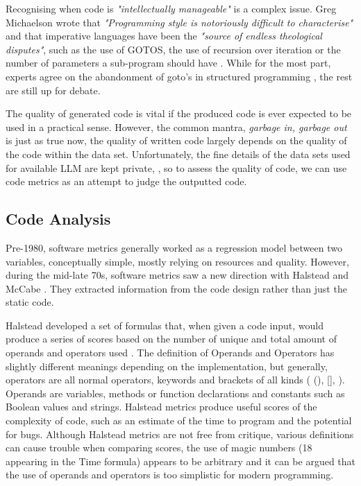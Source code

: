 \documentclass[manuscript,screen,review,sigconf]{acmart}
\begin{document}
Recognising when code is \textit{"intellectually manageable"} is a complex issue. Greg Michaelson wrote that \textit{"Programming style is notoriously difficult to characterise"} and that imperative languages have been the \textit{"source of endless theological disputes"}, such as the use of GOTOS, the use of recursion over iteration or the number of parameters a sub-program should have \cite{Automatic_analysis}. While for the most part, experts agree on the abandonment of goto's in structured programming \cite{gotoConsideredHarmful, KnuthGoTo}, the rest are still up for debate.

The quality of generated code is vital if the produced code is ever expected to be used in a practical sense. However, the common mantra, \textit{garbage in, garbage out} is just as true now, the quality of written code largely depends on the quality of the code within the data set. Unfortunately,  the fine details of the data sets used for available LLM are kept private, \cite{SysEvaOfLLMofCode}, so to assess the quality of code, we can use code metrics as an attempt to judge the outputted code.


\subsection{Code Analysis}
Pre-1980, software metrics generally worked as a regression model between two variables, conceptually simple, mostly relying on resources and quality. However, during the mid-late 70s, software metrics saw a new direction with Halstead and McCabe \cite{FENTON1999149}. They extracted information from the code design rather than just the static code.

Halstead developed a set of formulas that, when given a code input, would produce a series of scores based on the number of unique and total amount of operands and operators used \cite{Halstead}. The definition of Operands and Operators has slightly different meanings depending on the implementation, but generally, operators are all normal operators, keywords and brackets of all kinds ( (), [], {} ). Operands are variables, methods or function declarations and constants such as Boolean values and strings. Halstead metrics produce useful scores of the complexity of code, such as an estimate of the time to program and the potential for bugs. Although Halstead metrics are not free from critique, various definitions can cause trouble when comparing scores, the use of magic numbers (18 appearing in the Time formula) appears to be arbitrary and it can be argued that the use of operands and operators is too simplistic for modern programming.
\end{document}
